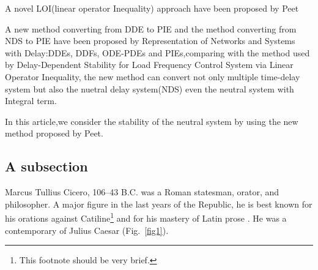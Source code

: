 \documentclass[twocolumn]{autart}    %
\begin{document}
A novel LOI(linear operator Inequality) approach have been proposed by Peet

A new method converting from DDE to PIE and the method converting from NDS to PIE 
have been proposed by Representation of Networks and Systems with Delay:DDEs, DDFs, 
ODE-PDEs and PIEs,comparing with the method used by Delay-Dependent Stability for 
Load Frequency Control System via Linear Operator Inequality, the new method can 
convert not only multiple time-delay system but also the nuetral delay system(NDS) 
even the neutral system with Integral term.

In this article,we consider the stability of the neutral system by using the new method 
proposed by Peet.






\subsection{A subsection}
Marcus Tullius Cicero, 106--43 B.C. was a Roman statesman, orator, 
and philosopher.  A major figure in the last years of the Republic, 
he is best known for his orations against Catiline\footnote{
This footnote should be very brief.}
and for his mastery of Latin prose \cite{Heritage:92}. He was a 
contemporary of Julius Caesar (Fig.~\ref{fig1}).
\end{document}
